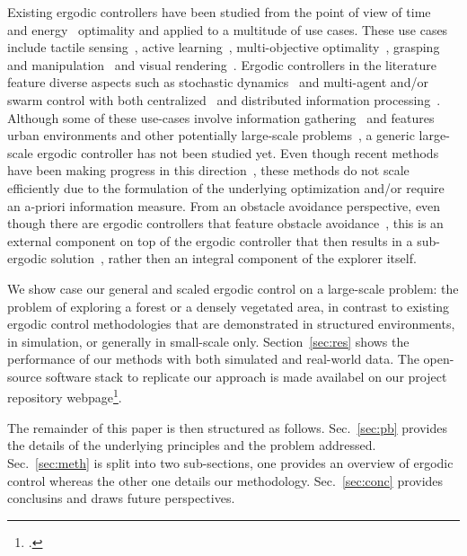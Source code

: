 \documentclass[letterpaper,10pt,conference,twoside]{IEEEtran}
\theoremstyle{definition}
\begin{document}
Existing ergodic controllers have been studied from the point of view of time~\cite{dong2023time} and energy~\cite{seewald2024energy,naveed2024eclares} optimality and applied to a multitude of use cases. These use cases include tactile sensing~\cite{abraham2017ergodic}, active learning~\cite{abraham2021ergodic}, multi-objective optimality~\cite{ren2023pareto,srinivasan2023multi}, grasping and manipulation~\cite{shetty2022ergodic,bilaloglu2023whole} and visual rendering~\cite{low2022drozbot,prabhakar2020autonomous}. Ergodic controllers in the literature feature diverse aspects such as stochastic dynamics~\cite{torre2016ergodic,ayvali2017ergodic} and multi-agent and/or swarm control with both centralized~\cite{seewald2024energy,rao2024learning} and distributed information processing~\cite{prabhakar2020ergodic,coffin2022multi}. Although some of these use-cases involve information gathering~\cite{dressel2018optimality} and features urban environments and other potentially large-scale problems~\cite{prabhakar2020ergodic,rao2023multi}, a generic large-scale ergodic controller has not been studied yet.
Even though recent methods have been making progress in this direction~\cite{whittemeyer2023bi,seewald2024energy,naveed2024eclares,dong2023time}, these methods do not scale efficiently due to the formulation of the underlying optimization and/or require an a-priori information measure. From an obstacle avoidance perspective, even though there are ergodic controllers that feature obstacle avoidance~\cite{lerch2023safety}, this is an external component on top of the ergodic controller that then results in a sub-ergodic solution~\cite{dong2023time}, rather then an integral component of the explorer itself.

We show case our general and scaled ergodic control on a large-scale problem: the problem of exploring a forest or a densely vegetated area, in contrast to existing ergodic control methodologies that are demonstrated in structured environments, in simulation, or generally in small-scale only. Section~\ref{sec:res} shows the performance of our methods with both simulated and real-world data. 
The open-source software stack to replicate our approach is made availabel on our project repository webpage\footnote{.}.

The remainder of this paper is then structured as follows. Sec.~\ref{sec:pb} provides the details of the underlying principles and the problem addressed. Sec.~\ref{sec:meth} is split into two sub-sections, one provides an overview of ergodic control whereas the other one details our methodology. Sec.~\ref{sec:conc} provides conclusins and draws future perspectives.
\end{document}
